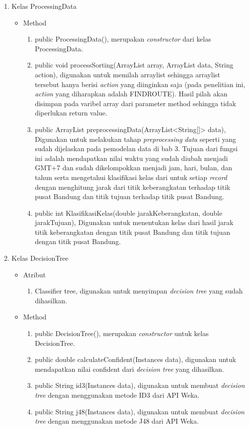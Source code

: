 \begin{enumerate}
	\item Kelas ProcessingData
	\begin{itemize}
		\item Method
		\begin{enumerate}
			\item public ProcessingData(), merupakan \textsl{constructor} dari kelas ProcessingData.
			\item public void processSorting(ArrayList array, ArrayList data, String action), digunakan untuk memilah arraylist sehingga arraylist tersebut hanya berisi \textsl{action} yang diinginkan saja (pada penelitian ini, \textsl{action} yang diharapkan adalah FINDROUTE). Hasil pilah akan disimpan pada varibel array dari parameter method sehingga tidak diperlukan return value.
			\item public ArrayList preprocessingData(ArrayList<String[]> data), Digunakan untuk melakukan tahap \textsl{preprocessing data} seperti yang sudah dijelaskan pada pemodelan data di bab 3. Tujuan dari fungsi ini adalah mendapatkan nilai waktu yang sudah diubah menjadi GMT+7 dan sudah dikelompokkan menjadi jam, hari, bulan, dan tahun serta mengetahui klasifikasi kelas dari untuk setiap \textsl{record} dengan menghitung jarak dari titik keberangkatan terhadap titik pusat Bandung dan titik tujuan terhadap titik pusat Bandung.
			\item public int KlasifikasiKelas(double jarakKeberangkatan, double jarakTujuan), Digunakan untuk menentukan kelas dari hasil jarak titik keberangkatan dengan titik pusat Bandung dan titik tujuan dengan titik pusat Bandung. 
		\end{enumerate}
	\end{itemize}

	\item Kelas DecisionTree
	\begin{itemize}
		\item Atribut
		\begin{enumerate}
			\item Classifier tree, digunakan untuk menyimpan \textsl{decision tree} yang sudah dihasilkan.
		\end{enumerate}
		\item Method
		\begin{enumerate}
			\item public DecisionTree(), merupakan \textsl{constructor} untuk kelas DecisionTree.
			\item public double calculateConfident(Instances data), digunakan untuk mendapatkan nilai confident dari \textsl{decision tree} yang dihasilkan.
			\item public String id3(Instances data), digunakan untuk membuat \textsl{decision tree} dengan menggunakan metode ID3 dari API Weka.
			\item public String j48(Instances data), digunakan untuk membuat \textsl{decision tree} dengan menggunakan metode J48 dari API Weka.
		\end{enumerate}
	\end{itemize}


\end{enumerate}
